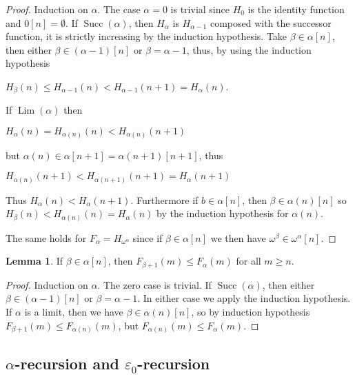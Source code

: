 \documentclass[8pt]{article}
\theoremstyle{definition}
\theoremstyle{definition}
\theoremstyle{definition}
\theoremstyle{definition}
\theoremstyle{definition}
\theoremstyle{definition}
\theoremstyle{definition}
\theoremstyle{definition}
\newtheorem{lemma}{Lemma}[section]
\theoremstyle{definition}
\theoremstyle{definition}
\theoremstyle{definition}
\theoremstyle{definition}
\theoremstyle{definition}
\theoremstyle{question}
\begin{document}
\begin{proof}
  Induction on $\alpha$. The case $\alpha = 0$ is trivial since $H_0$ is the identity function and $0[n] = \emptyset$.
  If $\operatorname{Succ}(\alpha)$, then $H_{\alpha}$ is $H_{\alpha - 1}$ composed with the successor function,
  it is strictly increasing by the induction hypothesis. 
  Take $\beta \in \alpha[n]$, then either $\beta \in (\alpha -1)[n]$ or $\beta = \alpha - 1$, thus, by using the induction hypothesis
  \begin{center}
    $H_{\beta}(n) \leq H_{\alpha - 1}(n) < H_{\alpha - 1}(n + 1) = H_{\alpha}(n)$.
  \end{center}

  If $\operatorname{Lim}(\alpha)$ then 
  \begin{center}
  $H_{\alpha}(n) = H_{\alpha(n)}(n) < H_{\alpha(n)}(n + 1)$
  \end{center}
  but $\alpha(n) \in \alpha[n + 1] = \alpha(n + 1)[n + 1]$, thus
  \begin{center}
    $H_{\alpha(n)}(n + 1) < H_{\alpha(n + 1)}(n + 1) = H_{\alpha}(n + 1)$
  \end{center}
  Thus $H_{\alpha}(n) < H_{\alpha}(n + 1)$. Furthermore if $b \in \alpha[n]$,
  then $\beta \in \alpha(n)[n]$ so $H_{\beta}(n) < H_{\alpha(n)}(n) = H_{\alpha}(n)$ by the induction hypothesis
  for $\alpha(n)$.

  The same holds for $F_{\alpha} = H_{\omega^{\alpha}}$ since if $\beta \in \alpha[n]$ we then have
  $\omega^{\beta} \in \omega^{\alpha}[n]$.
\end{proof}

\begin{lemma}
If $\beta \in \alpha[n]$, then $F_{\beta+1}(m) \leq F_{\alpha}(m)$ for all $m \geq n$.
\end{lemma}

\begin{proof}
Induction on $\alpha$. The zero case is trivial.
If $\operatorname{Succ}(\alpha)$, then either $\beta \in (\alpha - 1)[n]$ or $\beta = \alpha - 1$. In either case
we apply the induction hypothesis. If $\alpha$ is a limit, then we have $\beta \in \alpha(n)[n]$, so
by induction hypothesis $F_{\beta + 1}(m) \leq F_{\alpha(n)}(m)$, but $F_{\alpha(n)}(m) \leq F_{\alpha}(m)$.
\end{proof}

\subsection{$\alpha$-recursion and $\varepsilon_0$-recursion}
\end{document}
